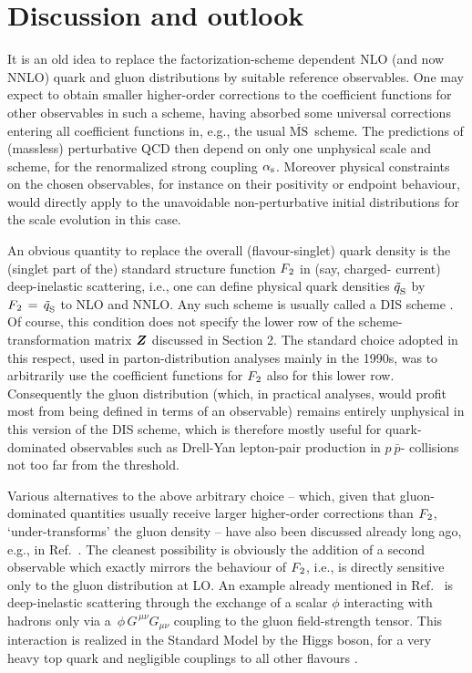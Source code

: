 \documentclass[12pt]{article}
\newcommand{\MSb}{$\overline{\mbox{MS}}$}
\newcommand{\as}{\alpha_{\rm s}}
\newcommand{\ZV}{\mbox{\boldmath $Z$}}
\begin{document}
\section{Discussion and outlook}
\label{sec:summary}
%
%
It is an old idea to replace the factorization-scheme dependent NLO (and now 
NNLO) quark and gluon distributions by suitable reference observables. One may 
expect to obtain smaller higher-order corrections to the coefficient functions 
for other observables in such a scheme, having absorbed some universal 
corrections entering all coefficient functions in, e.g., the usual \MSb\ scheme.
The predictions of (massless) perturbative QCD then depend on only one 
unphysical scale and scheme, for the renormalized strong coupling $\as$.  
Moreover physical constraints on the chosen observables, for instance on their 
positivity or endpoint behaviour, would directly apply to the unavoidable 
non-perturbative initial distributions for the scale evolution in this case.

An obvious quantity to replace the overall (flavour-singlet) quark density is
the (singlet part of the) standard structure function ${F_{\:\! 2}}$ in (say, 
charged- current) deep-inelastic scattering, i.e., one can define physical 
quark densities
$\tilde{q}_{\rm S}^{}$ by ${F_{\:\! 2}} \,=\, \tilde{q}_{\rm S}^{}$ to NLO and NNLO. 
Any such scheme is usually called a DIS scheme \cite{DISfact}. Of course, this
condition does not specify the lower row of the scheme-transformation matrix
$\ZV$ discussed in Section 2. The standard choice adopted in this respect,
used in parton-distribution analyses mainly in the 1990s, was to arbitrarily
use the coefficient functions for ${F_{\:\! 2}}$ also for this lower row. Consequently
the gluon distribution (which, in practical analyses, would profit most from 
being defined in terms of an observable) remains entirely unphysical in this
version of the DIS scheme, which is therefore mostly useful for quark-dominated
observables such as Drell-Yan lepton-pair production in $p\:\!\!\bar{p}$-%
collisions not too far from the threshold. 

Various alternatives to the above arbitrary choice -- which, given that 
gluon-dominated quantities usually receive larger higher-order corrections than
${F_{\:\! 2}}$, `under-transforms' the gluon density -- have also been discussed 
already long ago, e.g., in Ref.~\cite{FP82}. The cleanest possibility is 
obviously the addition of a second observable which exactly mirrors the 
behaviour of ${F_{\:\! 2}}$, i.e., is directly sensitive only to the gluon 
distribution at LO. An example already mentioned in Ref.~\cite{FP82} is 
deep-inelastic scattering through the exchange of a scalar $\phi$ interacting 
with hadrons only via a $\,\phi\,G^{\,\mu\nu} G_{\mu\nu}$ coupling to the 
gluon field-strength tensor.
This interaction is realized in the Standard Model by the Higgs boson, for a
very heavy top quark and negligible couplings to all other flavours
\cite{HGGeff}.
\end{document}

